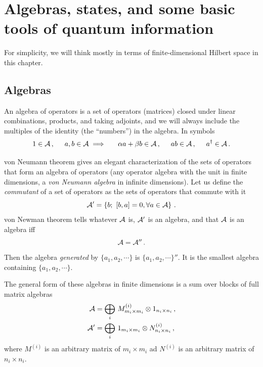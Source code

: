 \documentclass[12pt]{article}
\numberwithin{equation}{section}
\newcommand{\be}{\begin{equation}}
\newcommand{\ee}{\end{equation}}
\begin{document}
\newpage

\section{Algebras, states, and some basic tools of quantum information}
 
For simplicity, we will think mostly in terms of finite-dimensional Hilbert space in this chapter.

\subsection{Algebras}

 An algebra of operators is a set of operators (matrices) closed under linear combinations, products, and taking adjoints, and we will always include the multiples of the identity (the ``numbers'') in the algebra. In symbols
\be
1\in {\cal A}\,, \hspace{.5cm} a,b \in {\cal A}\implies  \hspace{.5cm} \alpha a +\beta b \in {\cal A}\,,\hspace{.5cm} a b\in {\cal A}\,,\hspace{.5cm} a^\dagger \in {\cal A}\,.   
\ee

von Neumann theorem gives an elegant characterization of the sets of operators that form an algebra of operators (any operator algebra with the unit in finite dimensions, a {\sl von Neumann algebra} in infinite dimensions). Let us define the {\sl commutant} of a set of operators as the sets of operators that commute with it
\be
{\cal A}' =\left\{b;\,\, [b,a]=0, \forall a\in {\cal A}   \right\}\,. 
\ee
von Newman theorem tells whatever ${\cal A}$ is, ${\cal A}'$ is an algebra, and that ${\cal A}$ is an algebra iff
\be
{\cal A}={\cal A}''\,. 
\ee
Then the algebra {\sl generated} by $\{a_1, a_2, \cdots \}$ is $\{a_1, a_2, \cdots \}''$. It is the smallest algebra containing $\{a_1, a_2, \cdots \}$. 

The general form of these algebras in finite dimensions is a sum over blocks of full matrix algebras   
\begin{align}
{\cal A} &= \bigoplus_i \, M^{(i)}_{m_i\times m_i}\otimes 1_{n_i\times n_i}\,,\\
{\cal A}' &= \bigoplus_i \,1_{m_i\times m_i} \otimes N^{(i)}_{n_i\times n_i} \,,
\end{align}
where $M^{(i)}$ is an arbitrary matrix of $m_i \times m_i$ ad $N^{(i)}$ is an arbitrary matrix of $n_i \times n_i$.
\end{document}
